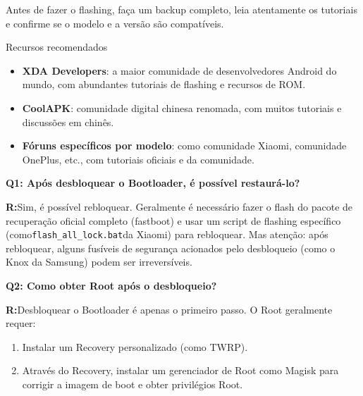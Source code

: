 Antes de fazer o flashing, faça um backup completo, leia atentamente os tutoriais e confirme se o modelo e a versão são compatíveis.

\begin{tcbinfo}{Recursos recomendados}
\begin{itemize}
  \item \textbf{XDA Developers}: a maior comunidade de desenvolvedores Android do mundo, com abundantes tutoriais de flashing e recursos de ROM.
  \item \textbf{CoolAPK}: comunidade digital chinesa renomada, com muitos tutoriais e discussões em chinês.
  \item \textbf{Fóruns específicos por modelo}: como comunidade Xiaomi, comunidade OnePlus, etc., com tutoriais oficiais e da comunidade.
\end{itemize}

\end{tcbinfo}


\textbf{Q1: Após desbloquear o Bootloader, é possível restaurá-lo?}\par

\textbf{R:}Sim, é possível rebloquear. Geralmente é necessário fazer o flash do pacote de recuperação oficial completo (fastboot) e usar um script de flashing específico (como\texttt{flash\_all\_lock.\allowbreak bat}da Xiaomi) para rebloquear. Mas atenção: após rebloquear, alguns fusíveis de segurança acionados pelo desbloqueio (como o Knox da Samsung) podem ser irreversíveis.

\textbf{Q2: Como obter Root após o desbloqueio?}\par

\textbf{R:}Desbloquear o Bootloader é apenas o primeiro passo. O Root geralmente requer:

\begin{enumerate}
  \item Instalar um Recovery personalizado (como TWRP).
  \item Através do Recovery, instalar um gerenciador de Root como Magisk para corrigir a imagem de boot e obter privilégios Root.
\end{enumerate}
